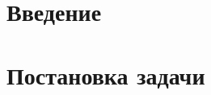 \documentclass[12pt]{article}
\begin{document}
	\newpage 	
	\newpage \section{Введение} 

	\section{Постановка задачи} 
	
	\newpage 
\end{document}

